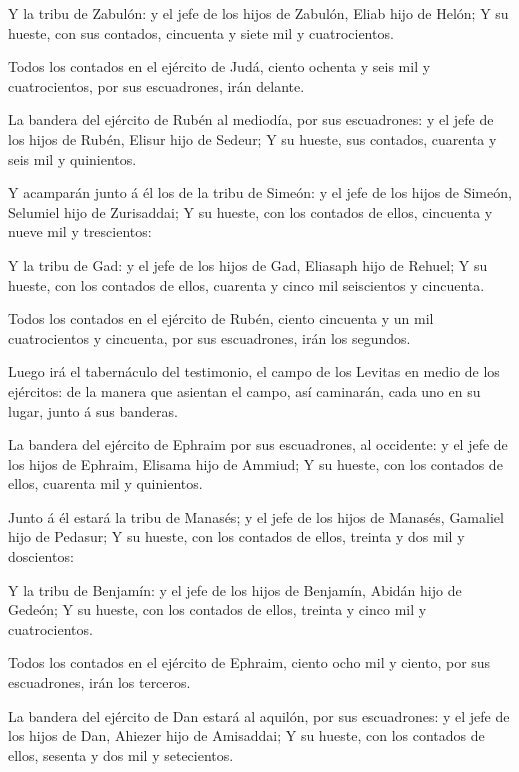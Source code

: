  Y la tribu de Zabulón: y el jefe de los hijos de Zabulón,
Eliab hijo de Helón;  Y su hueste, con sus contados,
cincuenta y siete mil y cuatrocientos.

 Todos los contados en el ejército de Judá, ciento ochenta y
seis mil y cuatrocientos, por sus escuadrones, irán delante.

 La bandera del ejército de Rubén al mediodía, por sus
escuadrones: y el jefe de los hijos de Rubén, Elisur hijo de Sedeur;
 Y su hueste, sus contados, cuarenta y seis mil y
quinientos.

 Y acamparán junto á él los de la tribu de Simeón: y el
jefe de los hijos de Simeón, Selumiel hijo de Zurisaddai; 
Y su hueste, con los contados de ellos, cincuenta y nueve mil y
trescientos:

 Y la tribu de Gad: y el jefe de los hijos de Gad, Eliasaph
hijo de Rehuel;  Y su hueste, con los contados de ellos,
cuarenta y cinco mil seiscientos y cincuenta.

 Todos los contados en el ejército de Rubén, ciento
cincuenta y un mil cuatrocientos y cincuenta, por sus escuadrones, irán
los segundos.

 Luego irá el tabernáculo del testimonio, el campo de los
Levitas en medio de los ejércitos: de la manera que asientan el campo,
así caminarán, cada uno en su lugar, junto á sus banderas.

 La bandera del ejército de Ephraim por sus escuadrones, al
occidente: y el jefe de los hijos de Ephraim, Elisama hijo de Ammiud;
 Y su hueste, con los contados de ellos, cuarenta mil y
quinientos.

 Junto á él estará la tribu de Manasés; y el jefe de los
hijos de Manasés, Gamaliel hijo de Pedasur;  Y su hueste,
con los contados de ellos, treinta y dos mil y doscientos:

 Y la tribu de Benjamín: y el jefe de los hijos de
Benjamín, Abidán hijo de Gedeón;  Y su hueste, con los
contados de ellos, treinta y cinco mil y cuatrocientos.

 Todos los contados en el ejército de Ephraim, ciento ocho
mil y ciento, por sus escuadrones, irán los terceros.

 La bandera del ejército de Dan estará al aquilón, por sus
escuadrones: y el jefe de los hijos de Dan, Ahiezer hijo de Amisaddai;
 Y su hueste, con los contados de ellos, sesenta y dos mil
y setecientos.

